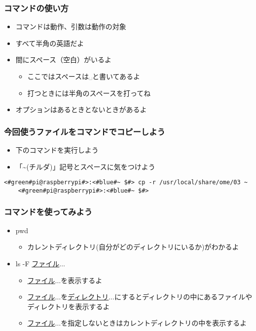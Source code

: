 \begin{frame}
    \frametitle{コマンドの使い方}
    \begin{figure}[h]
        \centering
        
    \end{figure}
    \begin{itemize}
        \item コマンドは動作、引数は動作の対象
        \item すべて半角の英語だよ
        \item 間にスペース（空白）がいるよ
            \begin{itemize}
                \item ここではスペースは␣と書いてあるよ
                \item 打つときには半角のスペースを打ってね
            \end{itemize}
        \item オプションはあるときとないときがあるよ
    \end{itemize}
\end{frame}

\begin{frame}[fragile]
    \frametitle{今回使うファイルをコマンドでコピーしよう}
    \begin{itemize}
        \item 下のコマンドを実行しよう
        \item 「\textasciitilde(チルダ)」記号とスペースに気をつけよう
    \end{itemize}
    \begin{lstlisting}[caption=使うファイルのコピー,label=workfilecopy]
    <#green#pi@raspberrypi#>:<#blue#~ $#> cp -r /usr/local/share/ome/03 ~
    <#green#pi@raspberrypi#>:<#blue#~ $#>
    \end{lstlisting}
\end{frame}

\begin{frame}
    \frametitle{コマンドを使ってみよう}
    \begin{itemize}
        \item pwd
        \begin{itemize}
            \item カレントディレクトリ(自分がどのディレクトリにいるか)がわかるよ
        \end{itemize}
        \item ls -F \underline{ファイル}$\ldots$
        \begin{itemize}
            \item \underline{ファイル}$\ldots$を表示するよ
            \item \underline{ファイル}$\ldots$を\underline{ディレクトリ}$\ldots$にするとディレクトリの中にあるファイルやディレクトリを表示するよ
            \item \underline{ファイル}$\ldots$を指定しないときはカレントディレクトリの中を表示するよ
        \end{itemize}
    \end{itemize}
\end{frame}


